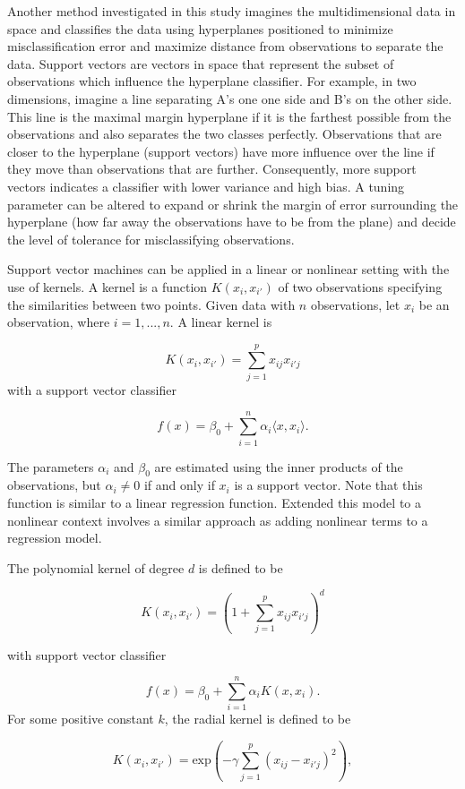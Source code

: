 \documentclass[12pt,twoside]{reedthesis}
\begin{document}
Another method investigated in this study imagines the multidimensional data in space and classifies the data using hyperplanes positioned to minimize misclassification error and maximize distance from observations to separate the data. Support vectors are vectors in space that represent the subset of observations which influence the hyperplane classifier. For example, in two dimensions, imagine a line separating A's one one side and B's on the other side. This line is the maximal margin hyperplane if it is the farthest possible from the observations and also separates the two classes perfectly. Observations that are closer to the hyperplane (support vectors) have more influence over the line if they move than observations that are further. Consequently, more support vectors indicates a classifier with lower variance and high bias. A tuning parameter can be altered to expand or shrink the margin of error surrounding the hyperplane (how far away the observations have to be from the plane) and decide the level of tolerance for misclassifying observations.

Support vector machines can be applied in a linear or nonlinear setting with the use of kernels. A kernel is a function \(K(x_i, x_{i'})\) of two observations specifying the similarities between two points. Given data with \(n\) observations, let \(x_i\) be an observation, where \(i = 1, ... ,n\). A linear kernel is

\[K(x_i, x_{i'}) = \sum_{j = 1}^p x_{ij}x_{i'j}\]
with a support vector classifier

\[f(x) = \beta_0 + \sum_{i = 1}^n \alpha_i \langle x, x_i \rangle.\]

The parameters \(\alpha_i\) and \(\beta_0\) are estimated using the inner products of the observations, but \(\alpha_i \neq 0\) if and only if \(x_i\) is a support vector. Note that this function is similar to a linear regression function. Extended this model to a nonlinear context involves a similar approach as adding nonlinear terms to a regression model.

The polynomial kernel of degree \(d\) is defined to be

\[K(x_i, x_{i'}) = \left( 1 + \sum_{j = 1}^p x_{ij}x_{i'j}\right)^d\]

with support vector classifier

\[f(x) = \beta_0 + \sum_{i = 1}^n \alpha_i K(x, x_i).\]
For some positive constant \(k\), the radial kernel is defined to be

\[K(x_i, x_{i'}) = \mbox{exp}\left( -\gamma\sum_{j = 1}^p(x_{ij} - x_{i'j})^2 \right),\]
\end{document}
